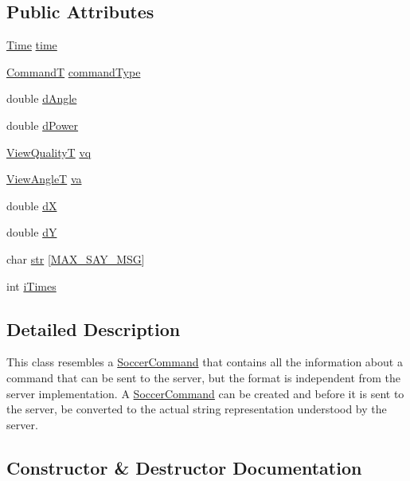\subsection*{Public Attributes}
\begin{DoxyCompactItemize}
\item 
\hyperlink{classTime}{Time} \hyperlink{classSoccerCommand_a5ce253af032683290460f177259912a6}{time}
\item 
\hyperlink{SoccerTypes_8h_ac986daf8a835e88572b79bcb63f5bbd5}{CommandT} \hyperlink{classSoccerCommand_a2e7d259965a11bacdc5eaba92e07dd24}{command\+Type}
\item 
double \hyperlink{classSoccerCommand_ac7c92357a850fcb7c0fba88c4867cbc1}{d\+Angle}
\item 
double \hyperlink{classSoccerCommand_aed60b006f38743bdd3c07e859b63f373}{d\+Power}
\item 
\hyperlink{SoccerTypes_8h_a5ae52e4e8062de90b118eacb03e99906}{View\+QualityT} \hyperlink{classSoccerCommand_a57d448f80f64ada2ca96506877bfc8b0}{vq}
\item 
\hyperlink{SoccerTypes_8h_ade95094b8e117801bea82ec390cccf64}{View\+AngleT} \hyperlink{classSoccerCommand_aa8709a9f44ea2feecd89dddf966dcb9e}{va}
\item 
double \hyperlink{classSoccerCommand_a91dc3c7136ee949d769371593cd1c280}{dX}
\item 
double \hyperlink{classSoccerCommand_acf593fd8e092f9352a0367f9aa5e1a40}{dY}
\item 
char \hyperlink{classSoccerCommand_a0bdfba0e05fdd6a179c6ebeb5bd5c954}{str} \mbox{[}\hyperlink{SoccerTypes_8h_a6ec2194d8f75b7a31ebe340c144165a2}{M\+A\+X\+\_\+\+S\+A\+Y\+\_\+\+M\+SG}\mbox{]}
\item 
int \hyperlink{classSoccerCommand_aa675c370ba898ae373c0e45f400f3137}{i\+Times}
\end{DoxyCompactItemize}


\subsection{Detailed Description}
This class resembles a \hyperlink{classSoccerCommand}{Soccer\+Command} that contains all the information about a command that can be sent to the server, but the format is independent from the server implementation. A \hyperlink{classSoccerCommand}{Soccer\+Command} can be created and before it is sent to the server, be converted to the actual string representation understood by the server. 

\subsection{Constructor \& Destructor Documentation}
